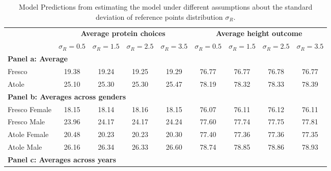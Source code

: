 \begin{table}[htbp]
\renewcommand{\arraystretch}{1.3}
\centering
{\small
\def\sym#1{\ifmmode^{#1}\else\(^{#1}\)\fi}
\caption{Model Predictions from estimating the model under different assumptions about the standard deviation of reference points distribution $\sigma_{R}$.\label{tab:paramfitmulti}}
\begin{adjustbox}{max width=1\textwidth}
\begin{tabular}{lcccc|cccc}
\toprule
& \multicolumn{4}{C{6cm}}{\hspace*{-10mm}\textbf{Average protein choices}} & \multicolumn{4}{C{6cm}}{\hspace*{-15mm}\textbf{Average height outcome}} \\
\cmidrule(l{5pt}r{5pt}){2-5} \cmidrule(l{5pt}r{5pt}){6-9}
& \multicolumn{1}{C{1.5cm}}{\textit{\small$\sigma_R=0.5$}} & \multicolumn{1}{C{1.5cm}}{\textit{\small$\sigma_R=1.5$}} & \multicolumn{1}{C{1.5cm}}{\textit{\small$\sigma_R=2.5$}} & \multicolumn{1}{C{1.5cm}}{\textit{\small$\sigma_R=3.5$}} & \multicolumn{1}{C{1.5cm}}{\textit{\small$\sigma_R=0.5$}} & \multicolumn{1}{C{1.5cm}}{\textit{\small$\sigma_R=1.5$}} & \multicolumn{1}{C{1.5cm}}{\textit{\small$\sigma_R=2.5$}} & \multicolumn{1}{C{1.5cm}}{\textit{\small$\sigma_R=3.5$}} \\      
\midrule
\multicolumn{9}{l}{\hspace*{0mm}\textbf{\normalsize Panel a: Average}} \\
Fresco          &  19.38&   19.24&   19.25&   19.29&   76.77&   76.77&   76.78&   76.77\\
Atole           &  25.10&   25.30&   25.30&   25.47&   78.19&   78.32&   78.33&   78.39\\
\midrule
\multicolumn{9}{l}{\hspace*{0mm}\textbf{\normalsize Panel b: Averages across genders}} \\
Fresco Female   &  18.15&   18.14&   18.16&   18.15&   76.07&   76.11&   76.12&   76.11\\
Fresco Male     &  23.96&   24.17&   24.17&   24.24&   77.60&   77.74&   77.75&   77.81\\
Atole Female    &  20.48&   20.23&   20.23&   20.30&   77.40&   77.36&   77.36&   77.35\\
Atole Male      &  26.16&   26.34&   26.33&   26.60&   78.74&   78.85&   78.86&   78.93\\
\midrule
\multicolumn{9}{l}{\hspace*{0mm}\textbf{\normalsize Panel c: Averages across years}} \\

\end{tabular}
\end{adjustbox}}
\end{table}

